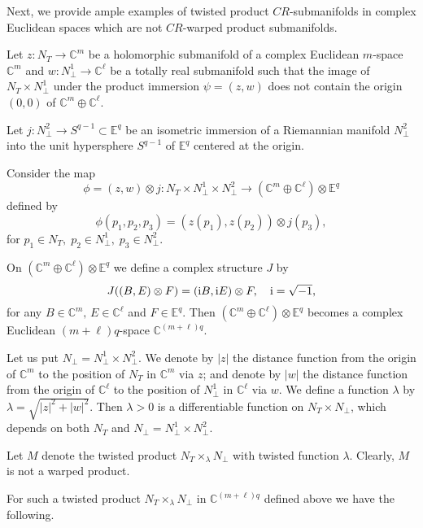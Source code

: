 \documentclass{amsart}
\theoremstyle{plain}
\numberwithin{equation}{section}
\theoremstyle{remark}
\numberwithin{equation}{section}
\begin{document}
Next, we provide ample examples of  twisted product $CR$-submanifolds in complex Euclidean spaces which are not $CR$-warped product submanifolds.

Let $z:N_T\to{\mathbb C}^m$ be a holomorphic submanifold of a complex Euclidean $m$-space ${\mathbb C}^m$ and $w:N^1_\perp\to {\mathbb C}^\ell$ be a totally real submanifold such that the image of $N_T\times N^1_\perp$ under the product immersion $\psi=(z,w)$ does not contain the origin $(0,0)$ of
${\mathbb C}^m\oplus {\mathbb C}^\ell$. 

Let $j:N_\perp^2\to S^{q-1}\subset {\mathbb E}^{q}$ be an isometric immersion of a Riemannian manifold $N_\perp^2$ into the unit hypersphere $S^{q-1}$ of ${\mathbb E}^{q}$ centered at the origin.  

Consider the map
$$\phi=(z, w)\otimes j:N_T\times N^1_\perp\times N^2_\perp\to ({\mathbb C}^m\oplus {\mathbb C}^\ell)\otimes 
{\mathbb E}^{q}$$
 defined by
\begin{equation}\label{Phi}\phi(p_1,p_2,p_3)=(z(p_1),z(p_2)) \otimes j(p_3),\end{equation}
for $ p_1\in N_T, \; p_2\in N^1_\perp,\; p_3\in N^2_\perp$.

On $({\mathbb C}^m\oplus {\mathbb C}^\ell)\otimes {\mathbb E}^{q}$ we define a complex structure $J$ by
$$J((B,E)\otimes F)=({\rm i}B,{\rm i} E)\otimes F,\quad {\rm i}=\sqrt{-1},$$ for any $B\in {\mathbb C}^m,\,E\in {\mathbb C}^\ell$ and $F\in {\mathbb E}^{q}$. Then $({\mathbb C}^m\oplus {\mathbb C} ^\ell)\otimes {\mathbb E}^{q}$ becomes a complex
Euclidean $(m+\ell)q$-space ${\mathbb C}^{(m+\ell)q}$.

Let us put $N_\perp=N^1_\perp\times N^2_\perp$. We denote by $|z|$ the distance function from the origin of ${\mathbb C}^m$ to the position of $N_T$ in ${\mathbb C}^m$ via $z$; and denote by  $|w|$
the distance function from the origin of ${\mathbb C}^\ell$ to the position of $N^1_\perp$ in ${\mathbb C}^\ell$ via $w$. We define a function $\lambda$ by $\lambda=\sqrt{|z|^2+|w|^2}$.
Then $\lambda>0$ is a differentiable function on $N_T\times N_\perp$, which depends on both $N_T$ and $N_\perp=N^1_\perp\times N^2_\perp$. 

Let $M$ denote the twisted product $N_T\times_\lambda N_\perp$ with twisted function $\lambda$. Clearly, $M$  is not a warped product.

For such a twisted product $N_T\times_\lambda N_\perp$ in ${\mathbb C}^{(m+\ell)q}$ defined above we have the following.
\end{document}
